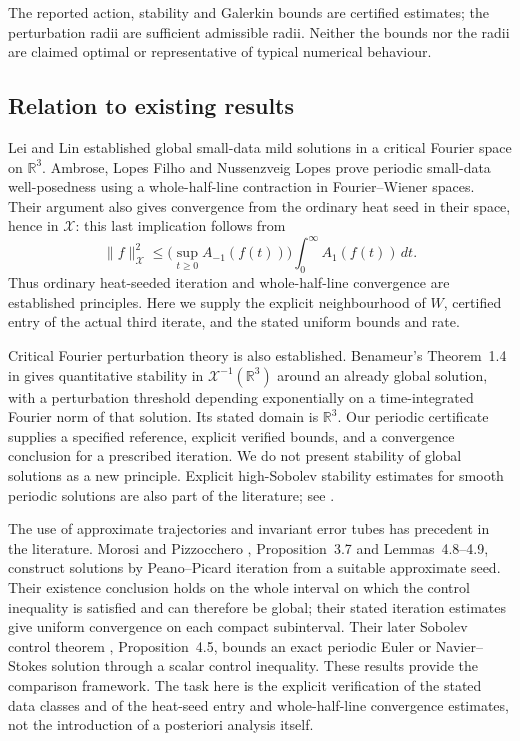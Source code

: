 The reported action, stability and Galerkin bounds are certified estimates; the perturbation radii are sufficient admissible radii. Neither the bounds nor the radii are claimed optimal or representative of typical numerical behaviour.

\subsection{Relation to existing results}

Lei and Lin \cite{LeiLin2011} established global small-data mild solutions in a critical Fourier space on \(\mathbb R^3\). Ambrose, Lopes Filho and Nussenzveig Lopes \cite{Ambrose2024} prove periodic small-data well-posedness using a whole-half-line contraction in Fourier--Wiener spaces. Their argument also gives convergence from the ordinary heat seed in their space, hence in \(\mathcal X\): this last implication follows from
\[
 \|f\|_{\mathcal X}^2
 \le\big(\sup_{t\ge0}A_{-1}(f(t))\big)
       \int_0^\infty A_1(f(t))\,dt.
\]
Thus ordinary heat-seeded iteration and whole-half-line convergence are established principles. Here we supply the explicit neighbourhood of \(W\), certified entry of the actual third iterate, and the stated uniform bounds and rate.

Critical Fourier perturbation theory is also established. Benameur's Theorem~1.4 in \cite{Benameur2013} gives quantitative stability in \(\mathcal X^{-1}(\mathbb R^3)\) around an already global solution, with a perturbation threshold depending exponentially on a time-integrated Fourier norm of that solution. Its stated domain is \(\mathbb R^3\). Our periodic certificate supplies a specified reference, explicit verified bounds, and a convergence conclusion for a prescribed iteration. We do not present stability of global solutions as a new principle. Explicit high-Sobolev stability estimates for smooth periodic solutions are also part of the literature; see \cite{Pizzocchero2021}.

The use of approximate trajectories and invariant error tubes has precedent in the literature. Morosi and Pizzocchero \cite{Morosi2007}, Proposition~3.7 and Lemmas~4.8--4.9, construct solutions by Peano--Picard iteration from a suitable approximate seed. Their existence conclusion holds on the whole interval on which the control inequality is satisfied and can therefore be global; their stated iteration estimates give uniform convergence on each compact subinterval. Their later Sobolev control theorem \cite{Morosi2011}, Proposition~4.5, bounds an exact periodic Euler or Navier--Stokes solution through a scalar control inequality. These results provide the comparison framework. The task here is the explicit verification of the stated data classes and of the heat-seed entry and whole-half-line convergence estimates, not the introduction of a posteriori analysis itself.

